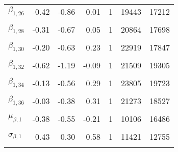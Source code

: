 \begin{table}
\begin{tabular}[t]{lrrrrrr}
$\beta_{1, 26}$ & -0.42 & -0.86 & 0.01 & 1 & 19443 & 17212\\
\cellcolor{gray!6}{$\beta_{1, 27}$} & \cellcolor{gray!6}{-0.56} & \cellcolor{gray!6}{-1.29} & \cellcolor{gray!6}{0.11} & \cellcolor{gray!6}{1} & \cellcolor{gray!6}{27082} & \cellcolor{gray!6}{18678}\\
$\beta_{1, 28}$ & -0.31 & -0.67 & 0.05 & 1 & 20864 & 17698\\
\cellcolor{gray!6}{$\beta_{1, 29}$} & \cellcolor{gray!6}{-0.30} & \cellcolor{gray!6}{-0.70} & \cellcolor{gray!6}{0.09} & \cellcolor{gray!6}{1} & \cellcolor{gray!6}{17759} & \cellcolor{gray!6}{10849}\\
$\beta_{1, 30}$ & -0.20 & -0.63 & 0.23 & 1 & 22919 & 17847\\
\cellcolor{gray!6}{$\beta_{1, 31}$} & \cellcolor{gray!6}{-0.83} & \cellcolor{gray!6}{-1.26} & \cellcolor{gray!6}{-0.39} & \cellcolor{gray!6}{1} & \cellcolor{gray!6}{16431} & \cellcolor{gray!6}{13801}\\
$\beta_{1, 32}$ & -0.62 & -1.19 & -0.09 & 1 & 21509 & 19305\\
\cellcolor{gray!6}{$\beta_{1, 33}$} & \cellcolor{gray!6}{-0.43} & \cellcolor{gray!6}{-1.15} & \cellcolor{gray!6}{0.29} & \cellcolor{gray!6}{1} & \cellcolor{gray!6}{25666} & \cellcolor{gray!6}{18973}\\
$\beta_{1, 34}$ & -0.13 & -0.56 & 0.29 & 1 & 23805 & 19723\\
\cellcolor{gray!6}{$\beta_{1, 35}$} & \cellcolor{gray!6}{0.10} & \cellcolor{gray!6}{-0.24} & \cellcolor{gray!6}{0.45} & \cellcolor{gray!6}{1} & \cellcolor{gray!6}{12552} & \cellcolor{gray!6}{15513}\\
$\beta_{1, 36}$ & -0.03 & -0.38 & 0.31 & 1 & 21273 & 18527\\
\cellcolor{gray!6}{$\mu_{\beta, 0}$} & \cellcolor{gray!6}{0.85} & \cellcolor{gray!6}{0.77} & \cellcolor{gray!6}{0.94} & \cellcolor{gray!6}{1} & \cellcolor{gray!6}{8914} & \cellcolor{gray!6}{14965}\\
$\mu_{\beta, 1}$ & -0.38 & -0.55 & -0.21 & 1 & 10106 & 16486\\
\cellcolor{gray!6}{$\sigma_{\beta, 0}$} & \cellcolor{gray!6}{0.18} & \cellcolor{gray!6}{0.11} & \cellcolor{gray!6}{0.26} & \cellcolor{gray!6}{1} & \cellcolor{gray!6}{5563} & \cellcolor{gray!6}{8022}\\
$\sigma_{\beta, 1}$ & 0.43 & 0.30 & 0.58 & 1 & 11421 & 12755\\
\cellcolor{gray!6}{$\sigma_{y}$} & \cellcolor{gray!6}{0.19} & \cellcolor{gray!6}{0.16} & \cellcolor{gray!6}{0.22} & \cellcolor{gray!6}{1} & \cellcolor{gray!6}{12876} & \cellcolor{gray!6}{17546}\\
\bottomrule
\end{tabular}
\end{table}